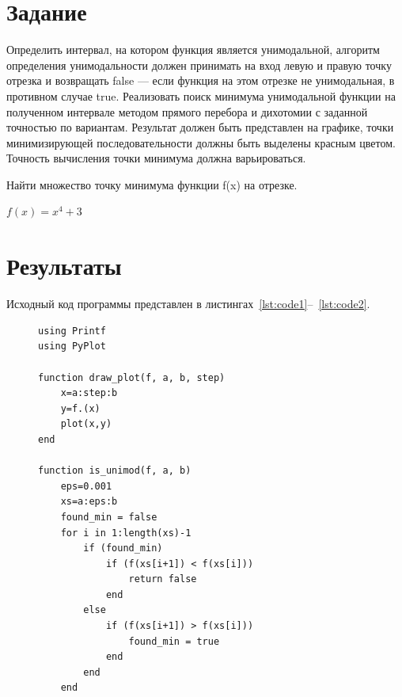 \documentclass[a4paper, 14pt]{extarticle}
\begin{document}
\renewcommand{\ttdefault}{pcr}

\setlength{\tabcolsep}{3pt}
\newpage
\setcounter{page}{2}

\section{Задание}\label{Sect::task}

Определить интервал, на котором функция является унимодальной, алгоритм
определения унимодальности должен принимать на вход левую и правую точку
отрезка и возвращать false — если функция на этом отрезке не унимодальная, в
противном случае true.
Реализовать поиск минимума унимодальной функции на полученном
интервале методом прямого перебора и дихотомии с заданной точностью по
вариантам. Результат должен быть представлен на графике, точки
минимизирующей последовательности должны быть выделены красным цветом.
Точность вычисления точки минимума должна варьироваться.

Найти множество точку минимума функции f(x) на отрезке.

$f(x)=x^4+3$

\section{Результаты}\label{Sect::res}

Исходный код программы представлен в листингах~\ref{lst:code1}--~\ref{lst:code2}.

\begin{figure}[!htb]
\begin{lstlisting}[language={},caption={Нахождение минимумов функции},label={lst:code1}]
using Printf
using PyPlot

function draw_plot(f, a, b, step)
    x=a:step:b
    y=f.(x)
    plot(x,y)
end

function is_unimod(f, a, b)
    eps=0.001
    xs=a:eps:b
    found_min = false
    for i in 1:length(xs)-1
        if (found_min)
            if (f(xs[i+1]) < f(xs[i]))
                return false
            end
        else
            if (f(xs[i+1]) > f(xs[i]))
                found_min = true
            end
        end
    end

\end{lstlisting}
\end{figure}

\newpage
\end{document}
